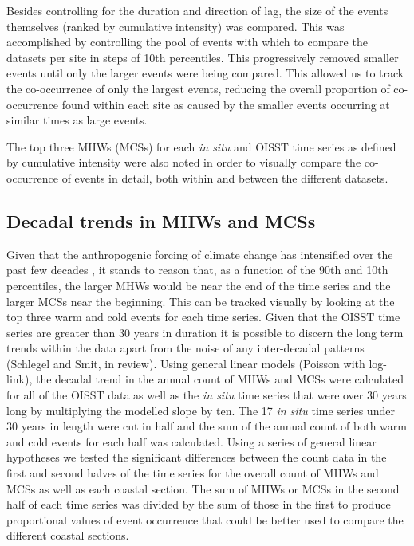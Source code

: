 \documentclass[a4paper,10pt,review]{elsarticle}
\begin{document}
Besides controlling for the duration and direction of lag, the size of the events themselves (ranked by cumulative intensity) was compared. This was accomplished by controlling the pool of events with which to compare the datasets per site in steps of 10th percentiles. This progressively removed smaller events until only the larger events were being compared. This allowed us to track the co-occurrence of only the largest events, reducing the overall proportion of co-occurrence found within each site as caused by the smaller events occurring at similar times as large events.

The top three MHWs (MCSs) for each \emph{in situ} and OISST time series as defined by cumulative intensity were also noted in order to visually compare the co-occurrence of events in detail, both within and between the different datasets.

\subsection{Decadal trends in MHWs and MCSs}
Given that the anthropogenic forcing of climate change has intensified over the past few decades \citep{IPCC2014}, it stands to reason that, as a function of the 90th and 10th percentiles, the larger MHWs would be near the end of the time series and the larger MCSs near the beginning. This can be tracked visually by looking at the top three warm and cold events for each time series. Given that the OISST time series are greater than 30 years in duration it is possible to discern the long term trends within the data apart from the noise of any inter-decadal patterns (Schlegel and Smit, in review). Using general linear models (Poisson with log-link), the decadal trend in the annual count of MHWs and MCSs were calculated for all of the OISST data as well as the \emph{in situ} time series that were over 30 years long by multiplying the modelled slope by ten. The 17 \emph{in situ} time series under 30 years in length were cut in half and the sum of the annual count of both warm and cold events for each half was calculated. Using a series of general linear hypotheses \citep{Hothorn2008} we tested the significant differences between the count data in the first and second halves of the time series for the overall count of MHWs and MCSs as well as each coastal section. The sum of MHWs or MCSs in the second half of each time series was divided by the sum of those in the first to produce proportional values of event occurrence that could be better used to compare the different coastal sections.
\end{document}
